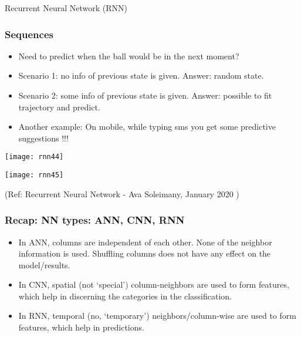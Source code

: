 \begin{frame}
  \begin{center}
    {\Large Recurrent Neural Network (RNN)}
  \end{center}
\end{frame}


\begin{frame}[fragile] \frametitle{Sequences}

\begin{itemize}
\item Need to predict when the ball would be in the next moment?
\item Scenario 1: no info of previous state is given. Answer: random state.
\item Scenario 2: some info of previous state is given. Answer: possible to fit trajectory and predict.
\item Another example: On mobile, while typing sms you get some predictive suggestions !!!
\end{itemize}

\begin{center}
\texttt{[image: rnn44]}

\texttt{[image: rnn45]}

\end{center}

{\tiny (Ref: Recurrent Neural Network - Ava Soleimany, January 2020 )}

\end{frame}


\begin{frame}[fragile] \frametitle{Recap: NN types: ANN, CNN, RNN}

\begin{itemize}
\item In ANN, columns are independent of each other. None of the neighbor information is used. Shuffling columns does not have any effect on the model/results.
\item In CNN, spatial (not `special') column-neighbors are used to form features, which help in discerning the categories in the classification.
\item In RNN, temporal (no, `temporary') neighbors/column-wise are used to form features, which help in predictions.
\end{itemize}

\end{frame}






